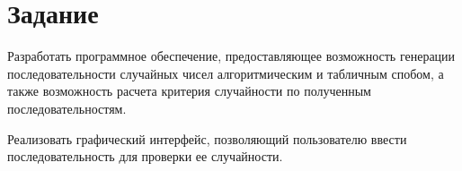\chapter{Задание}

Разработать программное обеспечение, предоставляющее возможность генерации 
последовательности случайных чисел алгоритмическим и табличным спобом, а также
возможность расчета критерия случайности по полученным последовательностям.

Реализовать графический интерфейс, позволяющий пользователю ввести
последовательность для проверки ее случайности.

